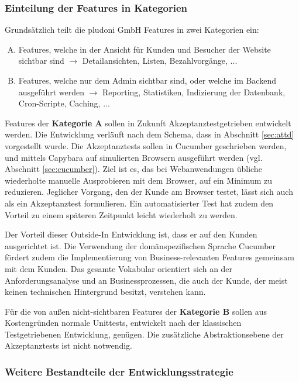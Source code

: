 \subsubsection{Einteilung der Features in Kategorien}
Grundsätzlich teilt die pludoni GmbH Features in zwei Kategorien ein:

\begin{enumerate}[A.]
 
 \item Features, welche in der Ansicht für Kunden und Besucher der Website sichtbar sind $\to$ Detailansichten, Listen, Bezahlvorgänge, ...
 \item Features, welche nur dem Admin sichtbar sind, oder welche im Backend ausgeführt werden $\to$ Reporting, Statistiken, Indizierung der Datenbank, Cron-Scripte, Caching, ...
\end{enumerate}

Features der \textbf{Kategorie A} sollen in Zukunft Akzeptanztestgetrieben entwickelt werden. Die Entwicklung verläuft nach dem Schema, dass in Abschnitt \ref{sec:attd} vorgestellt wurde. Die Akzeptanztests sollen in Cucumber geschrieben werden, und mittels Capybara auf simulierten Browsern ausgeführt werden (vgl. Abschnitt \ref{sec:cucumber}).
Ziel ist es, das bei Webanwendungen übliche wiederholte manuelle Ausprobieren mit dem Browser, auf ein Minimum zu reduzieren. Jeglicher Vorgang, den der Kunde am Browser testet, lässt sich auch als ein Akzeptanztest formulieren. Ein automatisierter Test hat zudem den Vorteil zu einem späteren Zeitpunkt leicht wiederholt zu werden. 

Der Vorteil dieser Outside-In Entwicklung ist, dass er auf den Kunden ausgerichtet ist. Die Verwendung der domänspezifischen Sprache Cucumber fördert zudem die Implementierung von Business-relevanten Features gemeinsam mit dem Kunden. Das gesamte Vokabular orientiert sich an der Anforderungsanalyse und an Businessprozessen, die auch der Kunde, der meist keinen technischen Hintergrund besitzt, verstehen kann.

Für die von außen nicht-sichtbaren Features der \textbf{Kategorie B} sollen aus Kostengründen normale Unittests, entwickelt nach der klassischen Testgetriebenen Entwicklung, genügen. Die zusätzliche Abstraktionsebene der Akzeptanztests ist nicht notwendig.

\subsubsection{Weitere Bestandteile der Entwicklungsstrategie}
\label{sec:auswahlWeitere}

